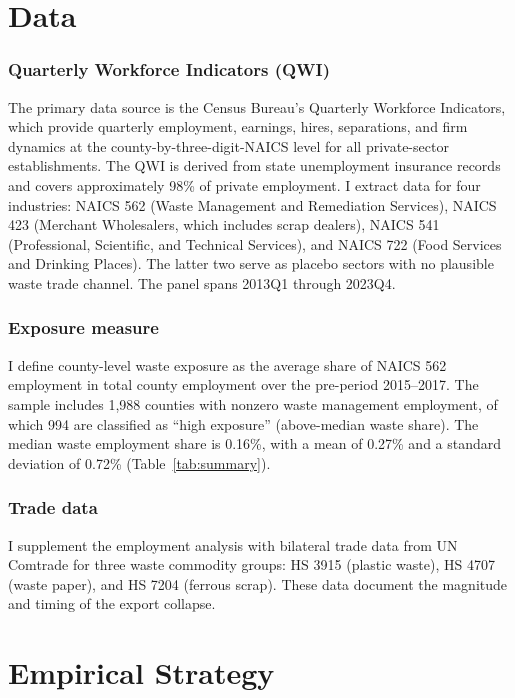 \documentclass[12pt]{article}
\begin{document}
\section{Data}

\subsubsection*{Quarterly Workforce Indicators (QWI)} The primary data source is the Census Bureau's Quarterly Workforce Indicators, which provide quarterly employment, earnings, hires, separations, and firm dynamics at the county-by-three-digit-NAICS level for all private-sector establishments. The QWI is derived from state unemployment insurance records and covers approximately 98\% of private employment. I extract data for four industries: NAICS 562 (Waste Management and Remediation Services), NAICS 423 (Merchant Wholesalers, which includes scrap dealers), NAICS 541 (Professional, Scientific, and Technical Services), and NAICS 722 (Food Services and Drinking Places). The latter two serve as placebo sectors with no plausible waste trade channel. The panel spans 2013Q1 through 2023Q4.

\subsubsection*{Exposure measure} I define county-level waste exposure as the average share of NAICS 562 employment in total county employment over the pre-period 2015--2017. The sample includes 1,988 counties with nonzero waste management employment, of which 994 are classified as ``high exposure'' (above-median waste share). The median waste employment share is 0.16\%, with a mean of 0.27\% and a standard deviation of 0.72\% (Table~\ref{tab:summary}).

\subsubsection*{Trade data} I supplement the employment analysis with bilateral trade data from UN Comtrade for three waste commodity groups: HS 3915 (plastic waste), HS 4707 (waste paper), and HS 7204 (ferrous scrap). These data document the magnitude and timing of the export collapse.

\section{Empirical Strategy}
\end{document}
